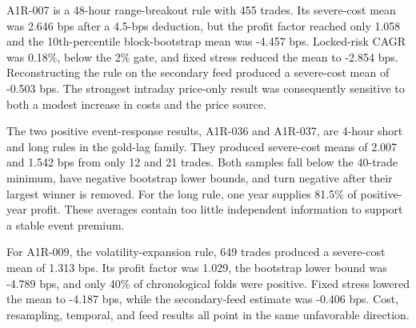 A1R-007 is a 48-hour range-breakout rule with 455 trades. Its severe-cost mean was 2.646 bps after a 4.5-bps deduction, but the profit factor reached only 1.058 and the 10th-percentile block-bootstrap mean was -4.457 bps. Locked-risk CAGR was 0.18\%, below the 2\% gate, and fixed stress reduced the mean to -2.854 bps. Reconstructing the rule on the secondary feed produced a severe-cost mean of -0.503 bps. The strongest intraday price-only result was consequently sensitive to both a modest increase in costs and the price source.

The two positive event-response results, A1R-036 and A1R-037, are 4-hour short and long rules in the gold-lag family. They produced severe-cost means of 2.007 and 1.542 bps from only 12 and 21 trades. Both samples fall below the 40-trade minimum, have negative bootstrap lower bounds, and turn negative after their largest winner is removed. For the long rule, one year supplies 81.5\% of positive-year profit. These averages contain too little independent information to support a stable event premium.

For A1R-009, the volatility-expansion rule, 649 trades produced a severe-cost mean of 1.313 bps. Its profit factor was 1.029, the bootstrap lower bound was -4.789 bps, and only 40\% of chronological folds were positive. Fixed stress lowered the mean to -4.187 bps, while the secondary-feed estimate was -0.406 bps. Cost, resampling, temporal, and feed results all point in the same unfavorable direction.

\begin{table}[t]
\centering
\caption{The five specifications with positive severe-cost means. Returns are mean basis points per native trade or rebalance.}\label{tab:positive_five}
\end{table}

